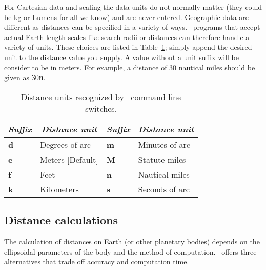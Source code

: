 For Cartesian data and scaling the data units do not normally matter (they could be
kg or Lumens for all we know) and are never entered.  Geographic data are different
as distances can be specified in a variety of ways.  \GMT\ programs that accept actual
Earth length scales like search radii or distances can therefore
handle a variety of units.  These choices are listed in Table~\ref{tbl:distunits};
simply append the desired unit to the distance value you supply.  A value without
a unit suffix will be consider to be in meters.  For example, a distance of
30 nautical miles should be given as 30\textbf{n}.
\begin{table}[H]
\centering
{}%
%
\begin{tabular}{|l|l||l|l|} \hline
\multicolumn{1}{|c|}{\emph{Suffix}} & \multicolumn{1}{c|}{\emph{Distance unit}} & \multicolumn{1}{|c|}{\emph{Suffix}} & \multicolumn{1}{c|}{\emph{Distance unit}} \\ \hline
\textbf{d}	&	Degrees of arc		& \textbf{m}	&	Minutes of arc  \\ \hline
\textbf{e}	&	Meters [Default]	& \textbf{M}	&	Statute miles   \\ \hline
\textbf{f}	&	Feet 			& \textbf{n}	&	Nautical miles  \\ \hline
\textbf{k}	&	Kilometers		& \textbf{s}	&	Seconds of arc  \\ \hline
\end{tabular}
\caption{Distance units recognized by \gmt\ command line switches.}
\label{tbl:distunits}
\end{table} 

\subsection{Distance calculations}

The calculation of distances on Earth (or other planetary bodies) depends on the
ellipsoidal parameters of the body and the method of computation.  \GMT\ offers
three alternatives that trade off accuracy and computation time.

